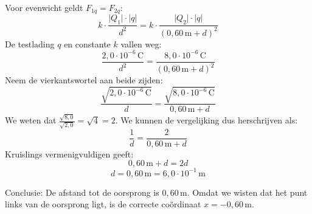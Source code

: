 \documentclass{ximera}
\begin{document}
\begin{exercise}
\begin{question}
\begin{solution}
            Voor evenwicht geldt \(F_{1q}=F_{2q}\):
            \[
                k\cdot \frac{\lvert Q_{1} \rvert \cdot  \lvert q\rvert}{d^{2}} = k\cdot \frac{\lvert Q_{2} \rvert \cdot \lvert q\rvert}{(0{,}60 \, \mathrm{m} + d)^{2}}
            \]
            De testlading \(q\) en constante \(k\) vallen weg:
            \[
                \frac{2{,}0 \cdot 10^{-6} \, \mathrm{C}}{d^{2}}=\frac{8{,}0 \cdot 10^{-6} \, \mathrm{C}}{(0{,}60 \, \mathrm{m} + d)^{2}}
            \]
            Neem de vierkantswortel aan beide zijden:
            \[
                \frac{\sqrt{2{,}0 \cdot 10^{-6} \, \mathrm{C}}}{d}=\frac{\sqrt{8{,}0 \cdot 10^{-6} \, \mathrm{C}}}{0{,}60 \, \mathrm{m} + d}
            \]
            We weten dat $\frac{\sqrt{8{,}0}}{\sqrt{2{,}0}} = \sqrt{4} = 2$. We kunnen de vergelijking dus herschrijven als:
            \[
                \frac{1}{d} = \frac{2}{0{,}60 \, \mathrm{m} + d}
            \]
            Kruislings vermenigvuldigen geeft:
            \[
                0{,}60 \, \mathrm{m} + d = 2d
            \]
            \[
                d = 0{,}60 \, \mathrm{m}= \boxed{6{,}0\cdot 10^{-1} \, \mathrm{m}}
            \]
            
            Conclusie: De afstand tot de oorsprong is $0{,}60 \, \mathrm{m}$. Omdat we wisten dat het punt links van de oorsprong ligt, is de correcte coördinaat $x = -0{,}60 \, \mathrm{m}$.
        \end{solution}
    \end{question}
\end{exercise}
\end{document}
